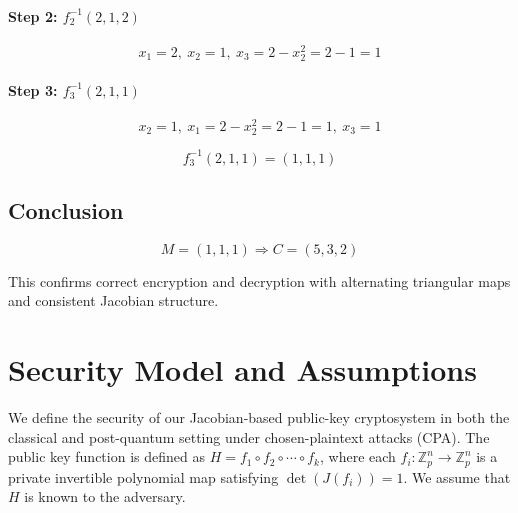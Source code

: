 \documentclass[12pt]{article}
\begin{document}
\paragraph{Step 2: \( f_2^{-1}(2, 1, 2) \)}

\[
x_1 = 2,\ x_2 = 1,\ x_3 = 2 - x_2^2 = 2 - 1 = 1
\]

\paragraph{Step 3: \( f_3^{-1}(2, 1, 1) \)}

\[
x_2 = 1,\ x_1 = 2 - x_2^2 = 2 - 1 = 1,\ x_3 = 1
\]

\[
f_3^{-1}(2, 1, 1) = (1, 1, 1)
\]

\subsection*{Conclusion}

\[
M = (1, 1, 1) \Rightarrow C = (5, 3, 2)
\]

This confirms correct encryption and decryption with alternating triangular maps and consistent Jacobian structure.


\section{Security Model and Assumptions}

We define the security of our Jacobian-based public-key cryptosystem in both the classical and post-quantum setting under chosen-plaintext attacks (CPA). The public key function is defined as \( H = f_1 \circ f_2 \circ \cdots \circ f_k \), where each \( f_i : \mathbb{Z}_p^n \rightarrow \mathbb{Z}_p^n \) is a private invertible polynomial map satisfying \( \det(J(f_i)) = 1 \). We assume that \( H \) is known to the adversary.

\begin{center}
\noindent
\setlength{\fboxsep}{10pt}
\end{center}
\end{document}
